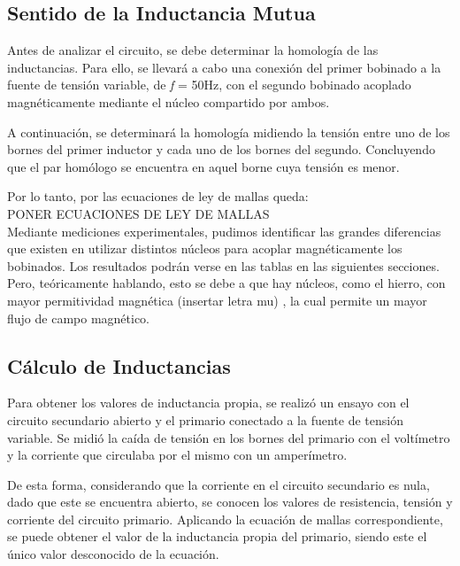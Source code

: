 \documentclass[a4paper,12pt]{article}
\begin{document}
\subsection{Sentido de la Inductancia Mutua}
\hspace{1cm} Antes de analizar el circuito, se debe determinar la homología de las inductancias. Para ello, se llevará
a cabo una conexión del primer bobinado a la fuente de tensión variable, de \textit{f} = 50Hz, con el segundo bobinado
acoplado magnéticamente mediante el núcleo compartido por ambos.

\hspace{1cm} A continuación, se determinará la homología midiendo la tensión entre uno de los bornes del primer inductor y 
cada uno de los bornes del segundo. Concluyendo que el par homólogo se encuentra en aquel borne cuya tensión es menor.

\hspace{1cm} Por lo tanto, por las ecuaciones de ley de mallas queda:
\\ PONER ECUACIONES DE LEY DE MALLAS
\\Mediante mediciones experimentales, pudimos identificar las grandes diferencias que existen en utilizar distintos
núcleos para acoplar magnéticamente los bobinados. Los resultados podrán verse en las tablas en las siguientes secciones. Pero,
teóricamente hablando, esto se debe a que hay núcleos, como el hierro, con mayor permitividad magnética  (insertar letra mu) 
, la cual permite un mayor flujo de campo magnético.


\subsection{Cálculo de Inductancias}

\hspace{1cm} Para obtener los valores de inductancia propia, se realizó un ensayo con el circuito secundario abierto y el primario
conectado a la fuente de tensión variable. Se midió la caída de tensión en los bornes del primario con el voltímetro y la corriente
que circulaba por el mismo con un amperímetro.

\hspace{1cm} De esta forma, considerando que la corriente en el circuito secundario es nula, dado que este se encuentra abierto,
se conocen los valores de resistencia, tensión y corriente del circuito primario. Aplicando la ecuación de mallas correspondiente,
se puede obtener el valor de la inductancia propia del primario, siendo este el único valor desconocido de la ecuación.
\end{document}
